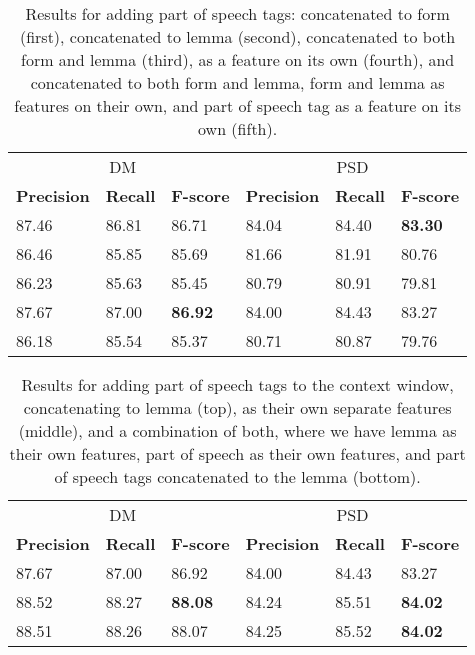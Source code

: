 \begin{table}
    \centering
    \smaller[0.2]
    \begin{tabular}{@{}llllll@{}}
        \toprule
        \multicolumn{3}{c}{DM}
        & \multicolumn{3}{c}{PSD} \\
        \textbf{Precision} & \textbf{Recall} & \textbf{F-score} & \textbf{Precision} & \textbf{Recall} & \textbf{F-score} \\
        \midrule
        87.46 & 86.81 & 86.71 & 84.04 & 84.40 & \textbf{83.30} \\
        86.46 & 85.85 & 85.69 & 81.66 & 81.91 & 80.76 \\
        86.23 & 85.63 & 85.45 & 80.79 & 80.91 & 79.81 \\
        87.67 & 87.00 & \textbf{86.92} & 84.00 & 84.43 & 83.27 \\
        86.18 & 85.54 & 85.37 & 80.71 & 80.87 & 79.76 \\
        \bottomrule
    \end{tabular}
    \caption{Results for adding part of speech tags: concatenated to form (first), concatenated to lemma (second), concatenated to both form and lemma (third), as a feature on its own (fourth), and concatenated to both form and lemma, form and lemma as features on their own, and part of speech tag as a feature on its own (fifth).}
    \label{table:pos}
\end{table}


\begin{table}
    \centering
    \smaller[0.2]
    \begin{tabular}{@{}llllll@{}}
        \toprule
        \multicolumn{3}{c}{DM}
        & \multicolumn{3}{c}{PSD} \\
        \textbf{Precision} & \textbf{Recall} & \textbf{F-score} & \textbf{Precision} & \textbf{Recall} & \textbf{F-score} \\
        \midrule
        87.67 & 87.00 & 86.92 & 84.00 & 84.43 & 83.27 \\
        88.52 & 88.27 & \textbf{88.08} & 84.24 & 85.51 & \textbf{84.02} \\
        88.51 & 88.26 & 88.07 & 84.25 & 85.52 & \textbf{84.02} \\
        \bottomrule
    \end{tabular}
    \caption{Results for adding part of speech tags to the context window, concatenating to lemma (top), as their own separate features (middle), and a combination of both, where we have lemma as their own features, part of speech as their own features, and part of speech tags concatenated to the lemma (bottom).}
    \label{table:pos_context}
\end{table}

